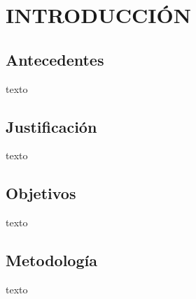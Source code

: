 \section{INTRODUCCIÓN} \label{sec:introduccion}

\subsection{Antecedentes}
texto
\subsection{Justificación}
texto
\subsection{Objetivos}
texto
\subsection{Metodología}
texto